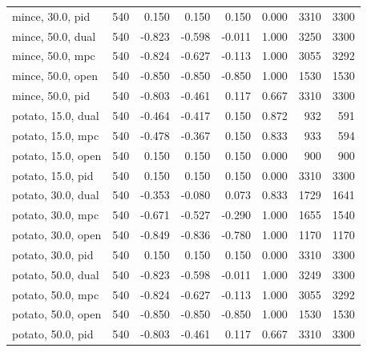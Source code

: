 \begin{longtable}{lrrrrrrr}
mince, 30.0, pid & 540 & 0.150 & 0.150 & 0.150 & 0.000 & 3310 & 3300 \\
mince, 50.0, dual & 540 & -0.823 & -0.598 & -0.011 & 1.000 & 3250 & 3300 \\
mince, 50.0, mpc & 540 & -0.824 & -0.627 & -0.113 & 1.000 & 3055 & 3292 \\
mince, 50.0, open & 540 & -0.850 & -0.850 & -0.850 & 1.000 & 1530 & 1530 \\
mince, 50.0, pid & 540 & -0.803 & -0.461 & 0.117 & 0.667 & 3310 & 3300 \\
potato, 15.0, dual & 540 & -0.464 & -0.417 & 0.150 & 0.872 & 932 & 591 \\
potato, 15.0, mpc & 540 & -0.478 & -0.367 & 0.150 & 0.833 & 933 & 594 \\
potato, 15.0, open & 540 & 0.150 & 0.150 & 0.150 & 0.000 & 900 & 900 \\
potato, 15.0, pid & 540 & 0.150 & 0.150 & 0.150 & 0.000 & 3310 & 3300 \\
potato, 30.0, dual & 540 & -0.353 & -0.080 & 0.073 & 0.833 & 1729 & 1641 \\
potato, 30.0, mpc & 540 & -0.671 & -0.527 & -0.290 & 1.000 & 1655 & 1540 \\
potato, 30.0, open & 540 & -0.849 & -0.836 & -0.780 & 1.000 & 1170 & 1170 \\
potato, 30.0, pid & 540 & 0.150 & 0.150 & 0.150 & 0.000 & 3310 & 3300 \\
potato, 50.0, dual & 540 & -0.823 & -0.598 & -0.011 & 1.000 & 3249 & 3300 \\
potato, 50.0, mpc & 540 & -0.824 & -0.627 & -0.113 & 1.000 & 3055 & 3292 \\
potato, 50.0, open & 540 & -0.850 & -0.850 & -0.850 & 1.000 & 1530 & 1530 \\
potato, 50.0, pid & 540 & -0.803 & -0.461 & 0.117 & 0.667 & 3310 & 3300 \\
\bottomrule
\end{longtable}

